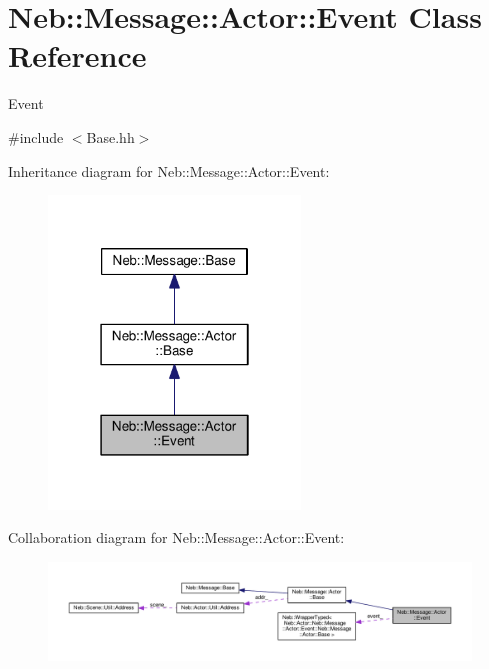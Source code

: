 \hypertarget{classNeb_1_1Message_1_1Actor_1_1Event}{\section{Neb\-:\-:Message\-:\-:Actor\-:\-:Event Class Reference}
\label{classNeb_1_1Message_1_1Actor_1_1Event}
}


Event  




{\ttfamily \#include $<$Base.\-hh$>$}



Inheritance diagram for Neb\-:\-:Message\-:\-:Actor\-:\-:Event\-:
\nopagebreak
\begin{figure}[H]
\begin{center}
\leavevmode
\includegraphics[width=190pt]{classNeb_1_1Message_1_1Actor_1_1Event__inherit__graph}
\end{center}
\end{figure}


Collaboration diagram for Neb\-:\-:Message\-:\-:Actor\-:\-:Event\-:
\nopagebreak
\begin{figure}[H]
\begin{center}
\leavevmode
\includegraphics[width=350pt]{classNeb_1_1Message_1_1Actor_1_1Event__coll__graph}
\end{center}
\end{figure}
